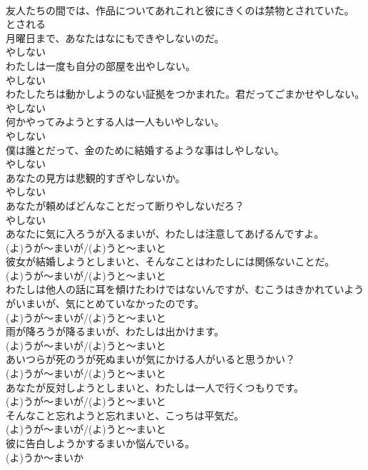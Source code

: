 \documentclass[8pt]{extreport}
\begin{document}
\begin{CJK}{UTF8}{min}
\\	友人たちの間では、作品についてあれこれと彼にきくのは禁物とされていた。	
\\	とされる	
\\	月曜日まで、あなたはなにもできやしないのだ。	
\\	やしない	
\\	わたしは一度も自分の部屋を出やしない。	
\\	やしない	
\\	わたしたちは動かしようのない証拠をつかまれた。君だってごまかせやしない。	
\\	やしない	
\\	何かやってみようとする人は一人もいやしない。	
\\	やしない	
\\	僕は誰とだって、金のために結婚するような事はしやしない。	
\\	やしない	
\\	あなたの見方は悲観的すぎやしないか。	
\\	やしない	
\\	あなたが頼めばどんなことだって断りやしないだろ？	
\\	やしない	
\\	あなたに気に入ろうが入るまいが、わたしは注意してあげるんですよ。	
\\	(よ)うが～まいが/(よ)うと～まいと	
\\	彼女が結婚しようとしまいと、そんなことはわたしには関係ないことだ。	
\\	(よ)うが～まいが/(よ)うと～まいと	
\\	わたしは他人の話に耳を傾けたわけではないんですが、むこうはきかれていようがいまいが、気にとめていなかったのです。	
\\	(よ)うが～まいが/(よ)うと～まいと	
\\	雨が降ろうが降るまいが、わたしは出かけます。	
\\	(よ)うが～まいが/(よ)うと～まいと	
\\	あいつらが死のうが死ぬまいが気にかける人がいると思うかい？	
\\	(よ)うが～まいが/(よ)うと～まいと	
\\	あなたが反対しようとしまいと、わたしは一人で行くつもりです。	
\\	(よ)うが～まいが/(よ)うと～まいと	
\\	そんなこと忘れようと忘れまいと、こっちは平気だ。	
\\	(よ)うが～まいが/(よ)うと～まいと	
\\	彼に告白しようかするまいか悩んでいる。	
\\	(よ)うか～まいか	

\end{CJK}
\end{document}
